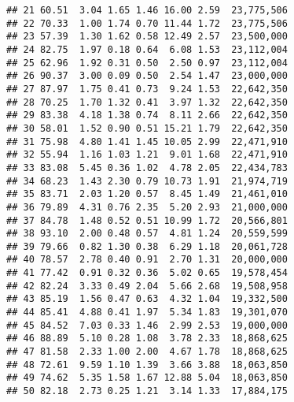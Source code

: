 \documentclass[
]{article}
\newenvironment{Shaded}{\begin{snugshade}}{\end{snugshade}}
\newcommand{\AttributeTok}[1]{\textcolor[rgb]{0.77,0.63,0.00}{#1}}
\newcommand{\FunctionTok}[1]{\textcolor[rgb]{0.00,0.00,0.00}{#1}}
\newcommand{\NormalTok}[1]{#1}
\newcommand{\OtherTok}[1]{\textcolor[rgb]{0.56,0.35,0.01}{#1}}
\newcommand{\SpecialCharTok}[1]{\textcolor[rgb]{0.00,0.00,0.00}{#1}}
\begin{document}
\begin{verbatim}
## 21 60.51  3.04 1.65 1.46 16.00 2.59  23,775,506 
## 22 70.33  1.00 1.74 0.70 11.44 1.72  23,775,506 
## 23 57.39  1.30 1.62 0.58 12.49 2.57  23,500,000 
## 24 82.75  1.97 0.18 0.64  6.08 1.53  23,112,004 
## 25 62.96  1.92 0.31 0.50  2.50 0.97  23,112,004 
## 26 90.37  3.00 0.09 0.50  2.54 1.47  23,000,000 
## 27 87.97  1.75 0.41 0.73  9.24 1.53  22,642,350 
## 28 70.25  1.70 1.32 0.41  3.97 1.32  22,642,350 
## 29 83.38  4.18 1.38 0.74  8.11 2.66  22,642,350 
## 30 58.01  1.52 0.90 0.51 15.21 1.79  22,642,350 
## 31 75.98  4.80 1.41 1.45 10.05 2.99  22,471,910 
## 32 55.94  1.16 1.03 1.21  9.01 1.68  22,471,910 
## 33 83.08  5.45 0.36 1.02  4.78 2.05  22,434,783 
## 34 68.23  1.43 2.30 0.79 10.73 1.91  21,974,719 
## 35 83.71  2.03 1.20 0.57  8.45 1.49  21,461,010 
## 36 79.89  4.31 0.76 2.35  5.20 2.93  21,000,000 
## 37 84.78  1.48 0.52 0.51 10.99 1.72  20,566,801 
## 38 93.10  2.00 0.48 0.57  4.81 1.24  20,559,599 
## 39 79.66  0.82 1.30 0.38  6.29 1.18  20,061,728 
## 40 78.57  2.78 0.40 0.91  2.70 1.31  20,000,000 
## 41 77.42  0.91 0.32 0.36  5.02 0.65  19,578,454 
## 42 82.24  3.33 0.49 2.04  5.66 2.68  19,508,958 
## 43 85.19  1.56 0.47 0.63  4.32 1.04  19,332,500 
## 44 85.41  4.88 0.41 1.97  5.34 1.83  19,301,070 
## 45 84.52  7.03 0.33 1.46  2.99 2.53  19,000,000 
## 46 88.89  5.10 0.28 1.08  3.78 2.33  18,868,625 
## 47 81.58  2.33 1.00 2.00  4.67 1.78  18,868,625 
## 48 72.61  9.59 1.10 1.39  3.66 3.88  18,063,850 
## 49 74.62  5.35 1.58 1.67 12.88 5.04  18,063,850 
## 50 82.18  2.73 0.25 1.21  3.14 1.33  17,884,175
\end{verbatim}

\begin{Shaded}
\end{Shaded}
\end{document}
